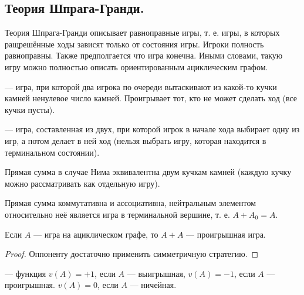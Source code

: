 \subsection{Теория Шпрага-Гранди.}
\begin{remark}
  Теория Шпрага-Гранди описывает равноправные игры, т. е. игры, в которых ращрешённые ходы зависят только
  от состояния игры. Игроки полность равноправны. Также предполгается что игра конечна. Иными словами,
  такую игру можно полностью описать ориентированным ациклическим графом.
\end{remark}

\begin{definition}
   --- игра, при которой два игрока по очереди вытаскивают из какой-то кучки камней
  ненулевое число камней. Проигрывает тот, кто не может сделать ход (все кучки пусты).
\end{definition}

\begin{definition}
   --- игра, составленная из двух, при которой игрок в начале хода выбирает
  одну из игр, а потом делает в ней ход (нельзя выбрать игру, которая находится в терминальном состоянии).
\end{definition}

\begin{remark}
  Прямая сумма в случае Нима эквивалентна двум кучкам камней (каждую кучку можно рассматривать как отдельную
  игру).
\end{remark}

\begin{remark}
  Прямая сумма коммутативна и ассоциативна, нейтральным элементом относительно неё является игра в
  терминальной вершине, т. е. $A + A_0 = A$.
\end{remark}

\begin{remark}
  Если $A$ --- игра на ациклическом графе, то $A + A$ --- проигрышная игра.
\end{remark}
\begin{proof}
  Оппоненту достаточно применить симметричную стратегию.
\end{proof}

\begin{definition}
   --- функция $v(A) = +1$, если $A$ --- выигрышная, $v(A) = -1$, если $A$ ---
  проигрышная. $v(A) = 0$, если $A$ --- ничейная.
\end{definition}

